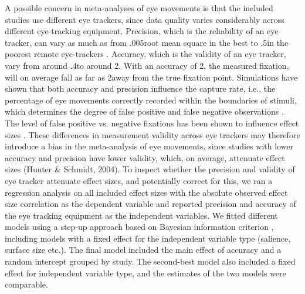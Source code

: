 \documentclass[english,natbib,man,floatsintext]{apa6}
\begin{document}
A possible concern in meta-analyses of eye movements is that the included studies use different eye trackers, since data quality varies considerably across different eye-tracking equipment. Precision, which is the reliability of an eye tracker, can vary as much as from .005\degree root mean square in the best to .5\degree in the poorest remote eye-trackers \citep{holmqvist2015a}. Accuracy, which is the validity of an eye tracker, vary from around .4\degree to around 2\degree \citep{holmqvist2015a}. With an accuracy of 2\degree, the measured fixation, will on average fall as far as 2\degree away from the true fixation point. Simulations have shown that both accuracy and precision influence the capture rate, i.e., the percentage of eye movements correctly recorded within the boundaries of stimuli, which determines the degree of false positive and false negative observations \citep{orquin2018a,orquin2019a}. The level of false positive vs. negative fixations has been shown to influence effect sizes \citep{orquin2016a}. These differences in measurement validity across eye trackers may therefore introduce a bias in the meta-analysis of eye movements, since studies with lower accuracy and precision have lower validity, which, on average, attenuate effect sizes (Hunter \& Schmidt, 2004). To inspect whether the precision and validity of eye tracker attenuate effect sizes, and potentially correct for this, we ran a regression analysis on all included effect sizes with the absolute observed effect size correlation as the dependent variable and reported precision and accuracy of the eye tracking equipment as the independent variables. We fitted different models using a step-up approach \citep{ryoo2011model} based on Bayesian information criterion \citep{Schwarz1978}, including models with a fixed effect for the independent variable type (salience, surface size etc.). The final model included the main effect of accuracy and a random intercept grouped by study. The second-best model also included a fixed effect for independent variable type, and the estimates of the two models were comparable.
\end{document}
